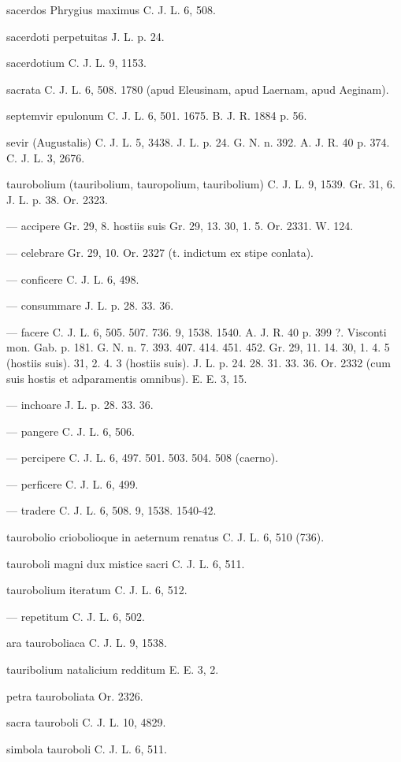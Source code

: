 \documentclass[a4paper, 11pt, oneside, polutonikogreek, german]{article}
\begin{document}
sacerdos Phrygius maximus C. J. L. 6, 508.

sacerdoti perpetuitas J. L. p. 24.

sacerdotium C. J. L. 9, 1153.

sacrata C. J. L. 6, 508. 1780 (apud Eleusinam, apud Laernam, apud Aeginam).

septemvir epulonum C. J. L. 6, 501. 1675. B. J. R. 1884 p. 56.

sevir (Augustalis) C. J. L. 5, 3438. J. L. p. 24. G. N. n. 392. A. J. R. 40 p. 374. C. J. L. 3, 2676.

taurobolium (tauribolium, tauropolium, tauribolium) C. J. L. 9, 1539. Gr. 31, 6. J. L. p. 38. Or. 2323.

--- accipere Gr. 29, 8. hostiis suis Gr. 29, 13. 30, 1. 5. Or. 2331. W. 124.

--- celebrare Gr. 29, 10. Or. 2327 (t. indictum ex stipe conlata).

--- conficere C. J. L. 6, 498.

--- consummare J. L. p. 28. 33. 36.

--- facere C. J. L. 6, 505. 507. 736. 9, 1538. 1540. A. J. R. 40 p. 399 ?. Visconti mon. Gab. p. 181. G. N. n. 7. 393. 407. 414. 451. 452. Gr. 29, 11. 14. 30, 1. 4. 5 (hostiis suis). 31, 2. 4. 3 (hostiis suis). J. L. p. 24. 28. 31. 33. 36. Or. 2332 (cum suis hostis et adparamentis omnibus). E. E. 3, 15.

--- inchoare J. L. p. 28. 33. 36.

--- pangere C. J. L. 6, 506.

--- percipere C. J. L. 6, 497. 501. 503. 504. 508 (caerno).

--- perficere C. J. L. 6, 499.

--- tradere C. J. L. 6, 508. 9, 1538. 1540-42.

taurobolio criobolioque in aeternum renatus C. J. L. 6, 510 (736).

tauroboli magni dux mistice sacri C. J. L. 6, 511.

taurobolium iteratum C. J. L. 6, 512.

--- repetitum C. J. L. 6, 502.

ara tauroboliaca C. J. L. 9, 1538.

tauribolium natalicium redditum E. E. 3, 2.

petra tauroboliata Or. 2326.

sacra tauroboli C. J. L. 10, 4829.

simbola tauroboli C. J. L. 6, 511.
\end{document}
